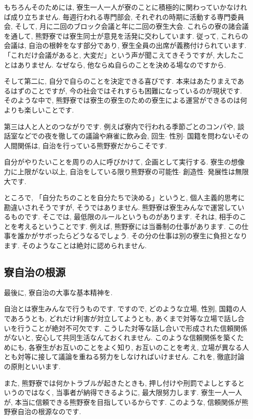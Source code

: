 \documentclass[10pt,b5jsbook,dvips,dvipdfmx,openany]{jsbook}
\theoremstyle{definition}
\begin{document}
		もちろんそのためには, 寮生一人一人が寮のことに積極的に関わっていかなければ成り立ちません. 毎週行われる専門部会, それぞれの時期に活動する専門委員会, そして, 月に二回のブロック会議と年に二回の寮生大会. これらの寮の諸会議を通して, 熊野寮では寮生同士が意見を活発に交わしています. 従って, これらの会議は, 自治の根幹をなす部分であり, 寮生全員の出席が義務付けられています. 「これだけ会議があると, 大変だ」という声が聞こえてきそうですが, 大したことはありません. なぜなら, 他ならぬ自らのことを決める場なのですから.

 		そして第二に, 自分で自らのことを決定できる喜びです. 本来はあたりまえであるはずのことですが, 今の社会ではそれすらも困難になっているのが現状です. そのような中で, 熊野寮では寮生の寮生のための寮生による運営ができるのは何よりも楽しいことです.

 		第三は人と人とのつながりです. 例えば寮内で行われる季節ごとのコンパや, 談話室などでの夜を徹しての議論や麻雀に飲み会, 回生$ \cdot $ 性別$ \cdot $ 国籍を問わないその人間関係は, 自治を行っている熊野寮だからこそです.

		自分がやりたいことを周りの人に呼びかけて, 企画として実行する. 寮生の想像力に上限がない以上, 自治をしている限り熊野寮の可能性$ \cdot $ 創造性$ \cdot $ 発展性は無限大です.

		ところで, 「自分たちのことを自分たちで決める」というと, 個人主義的思考に勘違いされそうですが, そうではありません. 熊野寮は寮生みんなで運営しているものです. そこでは, 最低限のルールというものがあります. それは, 相手のことを考えるということです. 例えば, 熊野寮には当番制の仕事があります. この仕事を誰かがサボったらどうなるでしょう. その分の仕事は別の寮生に負担となります. そのようなことは絶対に認められません.

		\subsection{寮自治の根源}

		 最後に, 寮自治の大事な基本精神を.

 		自治とは寮生みんなで行うものです. ですので, どのような立場, 性別, 国籍の人であろうとも, どれだけ利害が対立してようとも, あくまで対等な立場で話し合いを行うことが絶対不可欠です. こうした対等な話し合いで形成された信頼関係がないと, 安心して共同生活なんておくれません. このような信頼関係を築くためにも, 各寮生がお互いのことをよく知り, お互いのことを考え, 立場が異なる人とも対等に接して議論を重ねる努力をしなければいけません. これを, 徹底討論の原則といいます.

		また, 熊野寮では何かトラブルが起きたときも, 押し付けや刑罰でよしとするというのではなく, 当事者が納得できるように, 最大限努力します. 寮生一人一人が, 本当に信頼できる熊野寮を目指しているからです. このような, 信頼関係が熊野寮自治の根源なのです.
\end{document}
